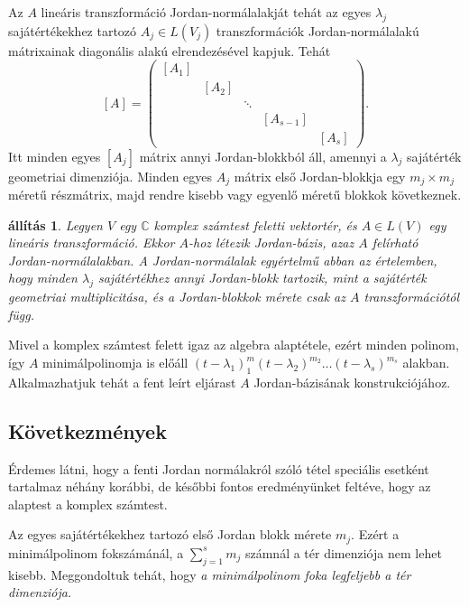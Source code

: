 \documentclass[9pt, a4paper, showtrims]{memoir}
\makeatletter
\renewenvironment{proof}[1][\proofname]
    {\par\pushQED{\qed}%
    \normalfont \topsep6\p@\@plus6\p@\relax
    \trivlist
    \item[\hskip\labelsep
        \itshape
    #1\@addpunct{:}]\ignorespaces}
    {\popQED\endtrivlist\@endpefalse}
\theoremstyle{plain}
\newtheorem{proposition}{állítás}[chapter]
\theoremstyle{remark}
\theoremstyle{definition}
\makeatother
\begin{document}
Az $A$ lineáris transzformáció Jordan-normálalakját tehát az egyes $\lambda_j$ sajátértékekhez tartozó $A_j\in L\left( V_j \right)$
transzformációk Jordan-normálalakú mátrixainak diagonális alakú elrendezésével kapjuk.
Tehát
\[
	[A]
	=
	\begin{pmatrix}
		[A_1] &             &        &                 &             \\
		      & \!\!\![A_2] &        &                 &             \\
		      & \!\!\!      & \ddots &                 &             \\
		      & \!\!\!      &        & \!\!\![A_{s-1}] &             \\
		      & \!\!\!      &        & \!\!\!          & \!\!\![A_s]
	\end{pmatrix}.
\]
Itt minden egyes $[A_j]$ mátrix annyi Jordan-blokkból áll,
amennyi a $\lambda_j$ sajátérték geometriai dimenziója.
Minden egyes $A_j$ mátrix első Jordan-blokkja
egy $m_j\times m_j$ méretű részmátrix,
majd rendre kisebb vagy egyenlő méretű blokkok következnek.
\begin{proposition}
	Legyen $V$ egy $\mathbb{C}$ komplex számtest feletti vektortér,
	és $A\in L\left( V \right)$ egy lineáris transzformáció.
	Ekkor $A$-hoz létezik Jordan-bázis, azaz $A$ felírható Jordan-normálalakban.
	A Jordan-normálalak egyértelmű abban az értelemben,
	hogy minden $\lambda_j$ sajátértékhez annyi Jordan-blokk tartozik, mint
	a sajátérték geometriai multiplicitása, és a Jordan-blokkok mérete csak az $A$ transzformációtól függ.
\end{proposition}
\begin{proof}
	Mivel a komplex számtest felett igaz az algebra alaptétele,
	ezért minden polinom, így $A$ minimálpolinomja is előáll
	$\left( t-\lambda_1 \right)^m_1\left( t-\lambda_2 \right)^{m_2}\dots\left( t-\lambda_s \right)^{m_s}$
	alakban.
	Alkalmazhatjuk tehát a fent leírt eljárast $A$ Jordan-bázisának konstrukciójához.
\end{proof}

\subsection{Következmények}
Érdemes látni,
hogy a fenti Jordan normálakról szóló tétel speciális esetként tartalmaz néhány korábbi,
de későbbi fontos eredményünket feltéve, hogy az alaptest a komplex számtest.

Az egyes sajátértékekhez tartozó első Jordan blokk mérete $m_j$.
Ezért a minimálpolinom fokszámánál, a $\sum_{j=1}^sm_j$ számnál a tér dimenziója nem lehet kisebb.
Meggondoltuk tehát, hogy \emph{a minimálpolinom foka legfeljebb  a tér dimenziója.}
\end{document}
